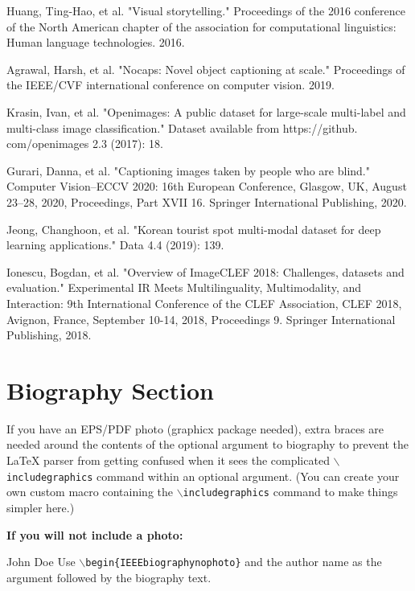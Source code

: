 \documentclass[lettersize,journal]{IEEEtran}
\begin{document}
\begin{thebibliography}{1}
Huang, Ting-Hao, et al. "Visual storytelling." Proceedings of the 2016 conference of the North American chapter of the association for computational linguistics: Human language technologies. 2016.

Agrawal, Harsh, et al. "Nocaps: Novel object captioning at scale." Proceedings of the IEEE/CVF international conference on computer vision. 2019.

Krasin, Ivan, et al. "Openimages: A public dataset for large-scale multi-label and multi-class image classification." Dataset available from https://github. com/openimages 2.3 (2017): 18.

Gurari, Danna, et al. "Captioning images taken by people who are blind." Computer Vision–ECCV 2020: 16th European Conference, Glasgow, UK, August 23–28, 2020, Proceedings, Part XVII 16. Springer International Publishing, 2020.

Jeong, Changhoon, et al. "Korean tourist spot multi-modal dataset for deep learning applications." Data 4.4 (2019): 139.

Ionescu, Bogdan, et al. "Overview of ImageCLEF 2018: Challenges, datasets and evaluation." Experimental IR Meets Multilinguality, Multimodality, and Interaction: 9th International Conference of the CLEF Association, CLEF 2018, Avignon, France, September 10-14, 2018, Proceedings 9. Springer International Publishing, 2018.

\end{thebibliography}


\newpage

\section{Biography Section}
If you have an EPS/PDF photo (graphicx package needed), extra braces are
 needed around the contents of the optional argument to biography to prevent
 the LaTeX parser from getting confused when it sees the complicated
 $\backslash${\tt{includegraphics}} command within an optional argument. (You can create
 your own custom macro containing the $\backslash${\tt{includegraphics}} command to make things
 simpler here.)
 
\vspace{11pt}

\bf{If you will not include a photo:}\vspace{-33pt}
\begin{IEEEbiographynophoto}{John Doe}
Use $\backslash${\tt{begin\{IEEEbiographynophoto\}}} and the author name as the argument followed by the biography text.
\end{IEEEbiographynophoto}




\vfill
\end{document}
